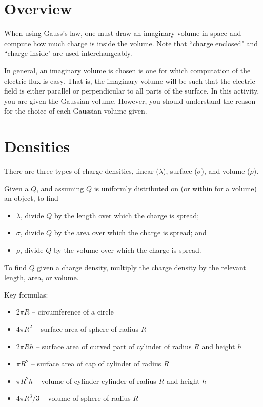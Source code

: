 \documentclass{article}
\begin{document}
\section{Overview}

When using Gauss's law, one must draw an imaginary volume in space and compute how much charge is inside the volume. Note that ``charge enclosed" and ``charge inside" are used interchangeably. 

In general, an imaginary volume is chosen is one for which computation of the electric flux is easy. That is, the imaginary volume will be such that the electric field is either parallel or perpendicular to all parts of the surface. In this activity, you are given the Gaussian volume. However, you should understand the reason for the choice of each Gaussian volume given.

\section{Densities}

There are three types of charge densities, linear ($\lambda$), surface ($\sigma$), and volume ($\rho$).

Given a $Q$, and assuming $Q$ is uniformly distributed on (or within for a volume) an object, to find 

\begin{itemize}

  \item $\lambda$, divide $Q$ by the length over which the charge is spread;

  \item $\sigma$, divide $Q$ by the area over which the charge is spread; and

  \item $\rho$, divide $Q$ by the volume over which the charge is spread.

\end{itemize}

To find $Q$ given a charge density, multiply the charge density by the relevant length, area, or volume.

Key formulas:

\begin{itemize}

  \item $2\pi R$ -- circumference of a circle

  \item $4\pi R^2$ -- surface area of sphere of radius $R$

  \item $2\pi R h$ -- surface area of curved part of cylinder of radius $R$ and height $h$

  \item $\pi R^2$ -- surface area of cap of cylinder of radius $R$

  \item $\pi R^2h$ -- volume of cylinder cylinder of radius $R$ and height $h$

  \item $4\pi R^3/3$ -- volume of sphere of radius $R$

\end{itemize}
\end{document}
